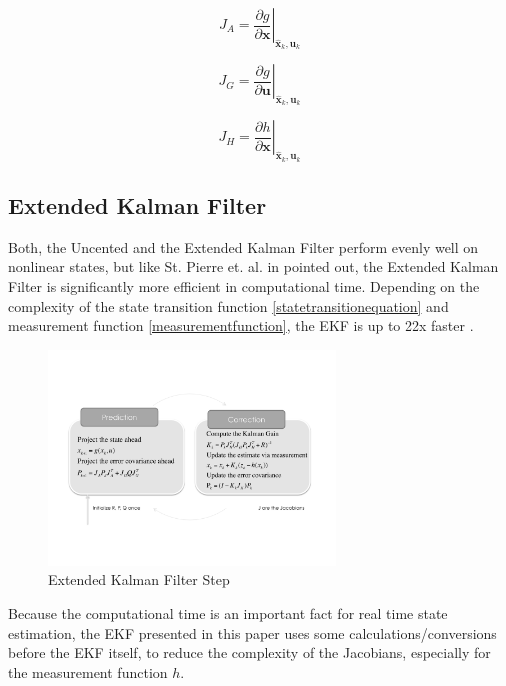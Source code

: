 \documentclass[a4paper,twoside]{article}
\begin{document}
\begin{equation}J_{A} = \left . \frac{\partial g}{\partial \boldsymbol{x} } \right \vert _{\hat{\boldsymbol{x}}_{k},\boldsymbol{u}_{k}}\end{equation}

\begin{equation}J_{G} = \left . \frac{\partial g}{\partial \boldsymbol{u} } \right \vert _{\hat{\boldsymbol{x}}_{k},\boldsymbol{u}_{k}}\end{equation}

\begin{equation}J_{H} = \left . \frac{\partial h}{\partial \boldsymbol{x} } \right \vert _{\hat{\boldsymbol{x}}_{k},\boldsymbol{u}_{k}}\end{equation}

\subsection{Extended Kalman Filter}

Both, the Uncented and the Extended Kalman Filter perform evenly well on nonlinear states, but like St. Pierre et. al. in \cite{St-Pierre2004} pointed out, the Extended Kalman Filter is significantly more efficient in computational time. Depending on the complexity of the state transition function \eqref{statetransitionequation} and measurement function \eqref{measurementfunction}, the EKF is up to 22x faster \cite{St-Pierre2004}.

\begin{figure}[ht]
\centering
\includegraphics[width=3.0in]{images/Extended-Kalman-Filter-Step.pdf}
\caption{Extended Kalman Filter Step}
\label{EKF}
\end{figure}

Because the computational time is an important fact for real time state estimation, the EKF presented in this paper uses some calculations/conversions before the EKF itself, to reduce the complexity of the Jacobians, especially for the measurement function $h$.
\end{document}
